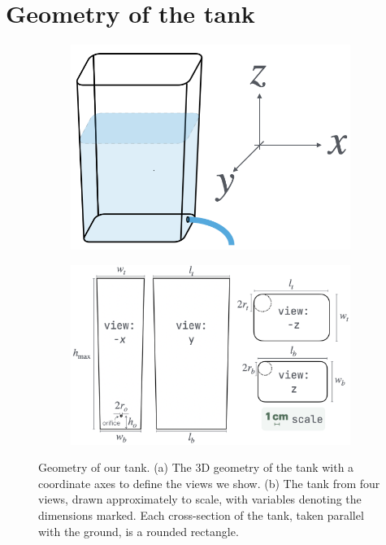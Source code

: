 \documentclass[a4paper,fleqn]{cas-sc}
\begin{document}
\newpage 

\section{Geometry of the tank}

\begin{figure}[h!]
	\centering
	 \begin{subfigure}[b]{0.35\textwidth}
		\includegraphics[width=\textwidth]{../drawings_and_photos/views.png} \caption{}
	\end{subfigure}
	
	\begin{subfigure}[b]{0.8\textwidth}
		\includegraphics[width=\textwidth]{../drawings_and_photos/tank_geometry.png} \caption{}
	\end{subfigure}
	\caption{Geometry of our tank. 
	(a) The 3D geometry of the tank with a coordinate axes to define the views we show. (b) The tank from four views, drawn approximately to scale, with variables denoting the dimensions marked. Each cross-section of the tank, taken parallel with the ground, is a rounded rectangle.
	}
\end{figure}
\end{document}
